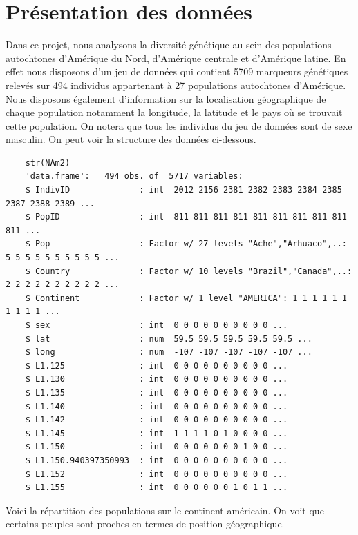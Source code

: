 \documentclass[12pt,a4paper]{article}
\begin{document}
\section{Présentation des données}
\noindent Dans ce projet, nous analysons la diversité génétique au sein des
populations autochtones d'Amérique du Nord, d'Amérique centrale et d'Amérique
latine. En effet nous disposons d'un jeu de données qui contient 5709 marqueurs
génétiques relevés sur 494 individus appartenant à 27 populations autochtones
d'Amérique. Nous disposons également d'information sur la localisation
géographique de chaque population notamment la longitude, la latitude et le
pays où se trouvait cette population. On notera que tous les individus du jeu
de données sont de sexe masculin. On peut voir la structure des données
ci-dessous.\vspace{2mm} 
\begin{lstlisting}
	str(NAm2)
	'data.frame':	494 obs. of  5717 variables:
	$ IndivID              : int  2012 2156 2381 2382 2383 2384 2385 2387 2388 2389 ...
	$ PopID                : int  811 811 811 811 811 811 811 811 811 811 ...
	$ Pop                  : Factor w/ 27 levels "Ache","Arhuaco",..: 5 5 5 5 5 5 5 5 5 5 ...
	$ Country              : Factor w/ 10 levels "Brazil","Canada",..: 2 2 2 2 2 2 2 2 2 2 ...
	$ Continent            : Factor w/ 1 level "AMERICA": 1 1 1 1 1 1 1 1 1 1 ...
	$ sex                  : int  0 0 0 0 0 0 0 0 0 0 ...
	$ lat                  : num  59.5 59.5 59.5 59.5 59.5 ...
	$ long                 : num  -107 -107 -107 -107 -107 ...
	$ L1.125               : int  0 0 0 0 0 0 0 0 0 0 ...
	$ L1.130               : int  0 0 0 0 0 0 0 0 0 0 ...
	$ L1.135               : int  0 0 0 0 0 0 0 0 0 0 ...
	$ L1.140               : int  0 0 0 0 0 0 0 0 0 0 ...
	$ L1.142               : int  0 0 0 0 0 0 0 0 0 0 ...
	$ L1.145               : int  1 1 1 1 0 1 0 0 0 0 ...
	$ L1.150               : int  0 0 0 0 0 0 0 1 0 0 ...
	$ L1.150.940397350993  : int  0 0 0 0 0 0 0 0 0 0 ...
	$ L1.152               : int  0 0 0 0 0 0 0 0 0 0 ...
	$ L1.155               : int  0 0 0 0 0 0 1 0 1 1 ...
\end{lstlisting}
Voici la répartition des populations sur le continent américain. On voit que 
certains peuples sont proches en termes de position géographique.
\end{document}
